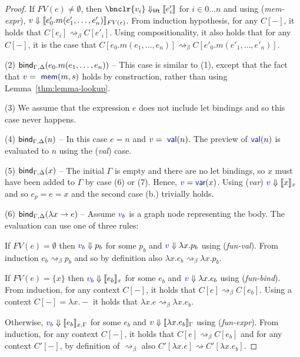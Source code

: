 \documentclass[sigplan,10pt]{acmart}\settopmatter{printfolios=true,printccs=false,printacmref=false}
\theoremstyle{plain}
\theoremstyle{definition}
\newcommand{\ident}[1]{\textnormal{\sffamily #1}}
\newcommand{\bndclr}[1]{\textcolor{kvdclr}{#1}}
\newcommand{\bnd}[1]{\textnormal{\textcolor{kvdclr}{\sffamily #1}}}
\begin{document}
\begin{proof}
  If $FV(e)\neq\emptyset$, then $\bnclr{v_i} \Downarrow_\ident{lift} \llbracket e'_i \rrbracket$ for $i\in 0\ldots n$ and 
  using (\emph{mem-expr}), $\bndclr{v}\Downarrow \llbracket e'_0.m(e'_1, \ldots, e'_n) \rrbracket_{FV(e)}$.
  From induction hypothesis, for any $C[-]$, it holds that $C[e_i] \rightsquigarrow_\beta C[e'_i]$.
  Using compositionality, it also holds that for any $C[-]$, it is the case that
  $C[e_0.m(e_1, \ldots, e_n)] \rightsquigarrow_\beta C[e'_0.m(e'_1, \ldots, e'_n)]$.

\newpage  
\vspace{0.75em}\noindent(2) $\ident{bind}_{\Gamma, \Delta}(e_0.m(e_1, \ldots, e_n))$ --
  This case is similar to (1), except that the fact that $\bndclr{v} = \bnd{mem}(m, s)$
  holds by construction, rather than using Lemma~\ref{thm:lemma-lookup}.

\vspace{0.75em}\noindent(3) We assume that the expression $e$ does not include let bindings and
  so this case never happens.

\vspace{0.75em}\noindent(4) $\ident{bind}_{\Gamma, \Delta}(n)$ -- In this case $e=n$ and $\bndclr{v} = \bnd{val}(n)$. The preview of
  $\bnd{val}(n)$ is evaluated to $n$ using the (\emph{val}) case.

\vspace{0.75em}\noindent(5) $\ident{bind}_{\Gamma, \Delta}(x)$ -- The initial $\Gamma$ is empty and
  there are no let bindings, so $x$ must have been added to $\Gamma$ by case (6) or (7). Hence,
  $\bndclr{v}=\bnd{var}(x)$. Using (\emph{var}) $\bndclr{v}\Downarrow \llbracket x \rrbracket_{x}$
  and so $e_p = e = x$ and the second case (b.) trivially holds.  

\vspace{0.75em}\noindent(6) $\ident{bind}_{\Gamma, \Delta}(\lambda x\rightarrow e)$ -- Assume
  $\bndclr{v_b}$ is a graph node representing the body. The evaluation can use one of three rules: 
  
  If $FV(e)=\emptyset$ then $\bndclr{v_b}\Downarrow p_b$ for some $p_b$ and $\bndclr{v}\Downarrow \lambda x.p_b$ 
  using (\emph{fun-val}). From induction $e_b \rightsquigarrow_\beta p_b$
  and so by definition also $\lambda x.e_b \rightsquigarrow_\beta \lambda x.p_b$.

  If $FV(e)=\{x\}$ then $\bndclr{v_b}\Downarrow \llbracket e_b \rrbracket_x$ for some $e_b$ and
  $\bndclr{v}\Downarrow \lambda x.e_b$ using (\emph{fun-bind}). From 
  induction, for any context $C[-]$, it holds that $C[e] \rightsquigarrow_\beta C[e_b]$.
  Using a context $C[-]=\lambda x.-$ it holds that $\lambda x.e \rightsquigarrow_\beta \lambda x.e_b$.

  Otherwise, $\bndclr{v_b}\Downarrow \llbracket e_b \rrbracket_{x,\Gamma}$ for some $e_b$ and
  $\bndclr{v}\Downarrow \llbracket\lambda x.e_b\rrbracket_\Gamma$ using (\emph{fun-expr}). From
  induction, for any context $C[-]$, it holds that $C[e] \rightsquigarrow_\beta C[e_b]$ 
  and for any context $C'[-]$, by definition of $\rightsquigarrow_\beta$ also 
  $C'[\lambda x.e] \rightsquigarrow C'[\lambda x.e_b]$.
\end{proof}
\end{document}
